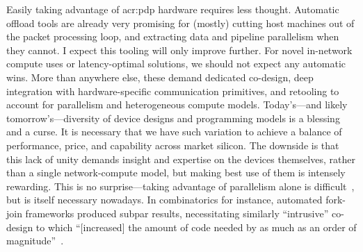 Easily taking advantage of \gls{acr:pdp} hardware requires less thought.
Automatic offload tools are already very promising for (mostly) cutting host machines out of the packet processing loop, and extracting data and pipeline parallelism when they cannot.
I expect this tooling will only improve further.
For novel in-network compute uses or latency-optimal solutions, we should not expect any automatic wins.
More than anywhere else, these demand dedicated co-design, deep integration with hardware-specific communication primitives, and retooling to account for parallelism and heterogeneous compute models.
Today's---and likely tomorrow's---diversity of device designs and programming models is a blessing and a curse.
It is necessary that we have such variation to achieve a balance of performance, price, and capability across market silicon.
The downside is that this lack of unity demands insight and expertise on the devices themselves, rather than a single network-compute model, but making best use of them is intensely rewarding.
This is no surprise---taking advantage of parallelism alone is difficult~\parencite{sutter-freelunch}, but is itself necessary nowadays.
In combinatorics for instance, automated fork-join frameworks produced subpar results, necessitating similarly ``intrusive'' co-design to \approachshort{} which ``[increased] the amount of code needed by as much as an order of magnitude''~\parencite[p.~214]{ciaran-phd}.
%
%
%
%

